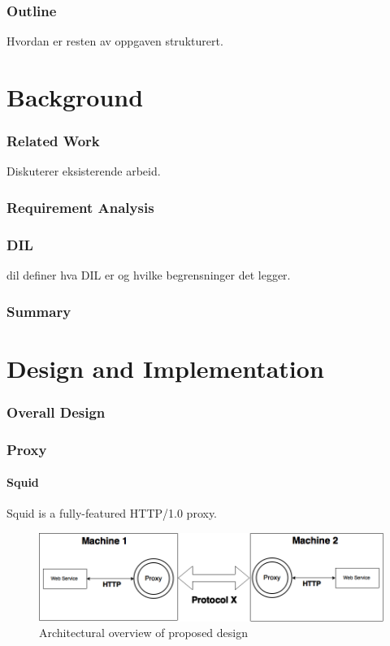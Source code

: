 \documentclass[USenglish]{article}
\begin{document}
\section{Outline}
Hvordan er resten av oppgaven strukturert.


\part{Background}
\section{Related Work}
Diskuterer eksisterende arbeid.

\section{Requirement Analysis}

\section{DIL}
\gls{dil} definer hva DIL er og hvilke begrensninger det legger.

\section{Summary}

\part{Design and Implementation}
\section{Overall Design}
\section{Proxy}
\subsection{Squid}
Squid is a fully-featured HTTP/1.0 proxy.
\begin{figure}[h]
\includegraphics[scale=0.4]{images/architecture.png}
\caption{Architectural overview of proposed design}
\end{figure}
\end{document}
